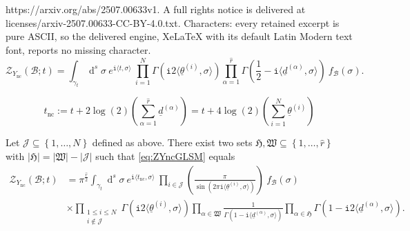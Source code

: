 \documentclass[10pt,a4paper]{amsart}
\DeclareMathOperator{\dd}{d}
\newcommand{\Br}{\mathcal{B}}
\newcommand{\Ync}{Y_{\mathrm{nc}}}
\newcommand{\ii}{\mathtt{i}}
\newcommand{\mz}{\mathcal{Z}}
\newcommand{\tnc}{t_{\mathrm{nc}}}
\begin{document}
https://arxiv.org/abs/2507.00633v1. A full rights notice is delivered at licenses/arxiv-2507.00633-CC-BY-4.0.txt. Characters: every retained excerpt is pure ASCII, so the delivered engine, XeLaTeX with its default Latin Modern text font, reports no missing character.
\begin{equation}
\label{eq:ZYncGLSM}
	\mz_{\Ync} \left( \Br; t \right) = \int_{\gamma_t} \dd^s \sigma~e^{\ii \langle t, \sigma\rangle } ~\prod_{i=1}^{N} \Gamma \left( \ii 2 \langle \underline{\theta}^{(i)}, \sigma \rangle \right) \prod_{\alpha=1}^{\hat{r}} \Gamma \left( \frac{1}{2} - \ii \langle\underline{d}^{(\alpha)}, \sigma \rangle \right) ~f_{\Br} (\sigma) .
\end{equation}

\begin{equation}
\label{eq:tncshift}
	\tnc := t + 2 \log (2) \left( \sum_{\alpha=1}^{\hat{r}} \underline{d}^{(\alpha)} \right) = t + 4\log (2) \left( \sum_{i=1}^{N} \underline{\theta}^{(i)} \right)
\end{equation}

\begin{lem}
Let $\mathcal{J} \subseteq \left\{ 1, \dots, N \right\}$ defined as above. There exist two sets $\mathfrak{H},\mathfrak{W} \subseteq \left\{ 1, \dots, \hat{r} \right\}$ with $\lvert \mathfrak{H}\rvert =\lvert \mathfrak{W}\rvert - \lvert \mathcal{J} \rvert $ such that \eqref{eq:ZYncGLSM} equals 
\begin{equation}
\begin{aligned}
	\mz_{\Ync} \left( \Br; t \right) &= \pi^{\frac{\hat{r}}{2}}  \int_{\gamma_t} \dd^s \sigma~ e^{\ii \langle \tnc, \sigma\rangle } ~ \prod_{i \in \mathcal{J} } \left( \frac{\pi}{\sin \left( 2 \pi \ii \langle \underline{\theta}^{(i)}, \sigma \rangle\right)} \right) ~f_{\Br} (\sigma) \\
		&\times \prod_{\substack{ 1 \le i \le N \\ i \notin \mathcal{J} }} \Gamma \left( \ii 2 \langle \underline{\theta}^{(i)}, \sigma \rangle \right) \prod_{\alpha \in \mathfrak{W}} \frac{1}{\Gamma \left( 1 - \ii \langle\underline{d}^{(\alpha)}, \sigma \rangle \right)} \prod_{\alpha\in \mathfrak{H} } \Gamma \left( 1 - \ii 2 \langle\underline{d}^{(\alpha)}, \sigma \rangle \right) .
\end{aligned}
\label{eq:ZYnclemma1}
\end{equation}
\end{lem}
\end{document}
